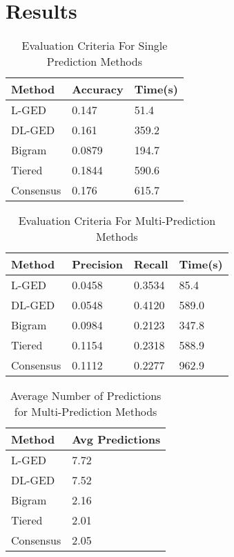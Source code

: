 \documentclass[11pt]{article}
\begin{document}
\section{Results}

\begin{table}[h]
 \begin{center}
\begin{tabular}{|l|l|l|}
      \hline
      Method & Accuracy & Time(s) \\
      \hline\hline
      L-GED & 0.147 & 51.4 \\
      DL-GED & 0.161 & 359.2 \\
      Bigram  & 0.0879 & 194.7 \\
      Tiered & 0.1844 & 590.6 \\
      Consensus & 0.176 & 615.7 \\
      \hline
\end{tabular}
\caption{Evaluation Criteria For Single Prediction Methods}\label{table1}
 \end{center}
\end{table}

\begin{table}[h]
 \begin{center}
\begin{tabular}{|l|l|l|l|}
      \hline
      Method & Precision & Recall & Time(s)\\
      \hline\hline
      L-GED & 0.0458 & 0.3534 & 85.4 \\
      DL-GED & 0.0548 & 0.4120 & 589.0 \\
      Bigram & 0.0984 & 0.2123 & 347.8 \\
	  Tiered & 0.1154 & 0.2318 & 588.9 \\
	  Consensus & 0.1112 & 0.2277 & 962.9 \\    
      \hline
\end{tabular}
\caption{Evaluation Criteria For Multi-Prediction Methods}\label{table2}
 \end{center}
\end{table}

\begin{table}[h]
 \begin{center}
\begin{tabular}{|l|l|}
      \hline
      Method & Avg Predictions\\
      \hline\hline
      L-GED & 7.72 \\
      DL-GED & 7.52 \\
      Bigram & 2.16 \\
	  Tiered & 2.01 \\
	  Consensus & 2.05 \\    
      \hline
\end{tabular}
\caption{Average Number of Predictions for Multi-Prediction Methods}\label{table2}
 \end{center}
\end{table}
\end{document}
